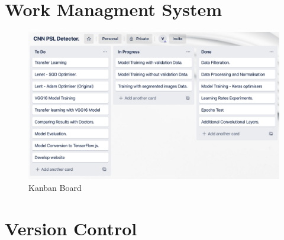 \pagebreak
\section{Work Managment System}
\begin{figure}[!htp]
    \centering
    \includegraphics[width=15cm]{Images/Kanban Bords.png}
    \caption{Kanban Board}
\end{figure}
\pagebreak
\section{Version Control}




